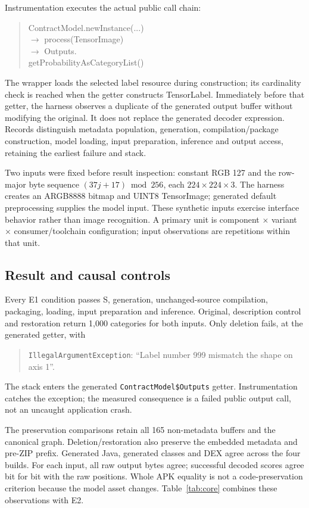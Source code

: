 \documentclass[10pt,twocolumn,letterpaper]{article}
\newcommand{\code}[1]{\texttt{#1}}
\begin{document}
Instrumentation executes the actual public call chain:
\begin{quote}\small\ttfamily\raggedright
ContractModel.newInstance(...)\\
\quad\(\rightarrow\) process(TensorImage)\\
\quad\(\rightarrow\) Outputs.\\
\hspace*{1.4em}getProbabilityAsCategoryList()
\end{quote}
The wrapper loads the selected label resource during construction; its cardinality check is reached when the getter constructs TensorLabel. Immediately before that getter, the harness observes a duplicate of the generated output buffer without modifying the original. It does not replace the generated decoder expression. Records distinguish metadata population, generation, compilation/package construction, model loading, input preparation, inference and output access, retaining the earliest failure and stack.

Two inputs were fixed before result inspection: constant RGB 127 and the row-major byte sequence $(37j+17)\bmod256$, each $224\times224\times3$. The harness creates an ARGB8888 bitmap and UINT8 TensorImage; generated default preprocessing supplies the model input. These synthetic inputs exercise interface behavior rather than image recognition. A primary unit is component $\times$ variant $\times$ consumer/toolchain configuration; input observations are repetitions within that unit.

\subsection{Result and causal controls}
Every E1 condition passes S, generation, unchanged-source compilation, packaging, loading, input preparation and inference. Original, description control and restoration return 1,000 categories for both inputs. Only deletion fails, at the generated getter, with
\begin{quote}\small\raggedright
\code{IllegalArgumentException}: ``Label number 999 mismatch the shape on axis 1''.
\end{quote}
The stack enters the generated \code{ContractModel\$Outputs} getter. Instrumentation catches the exception; the measured consequence is a failed public output call, not an uncaught application crash.

The preservation comparisons retain all 165 non-metadata buffers and the canonical graph. Deletion/restoration also preserve the embedded metadata and pre-ZIP prefix. Generated Java, generated classes and DEX agree across the four builds. For each input, all raw output bytes agree; successful decoded scores agree bit for bit with the raw positions. Whole APK equality is not a code-preservation criterion because the model asset changes. Table~\ref{tab:core} combines these observations with E2.
\end{document}

